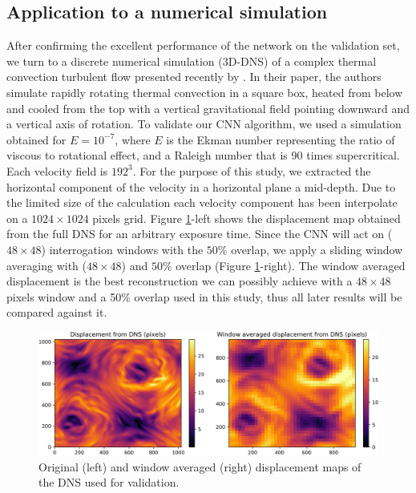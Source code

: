 \documentclass{svjour3}                     %
\begin{document}
\subsection{Application to a numerical simulation}

After confirming the excellent performance of the network on the validation set, we turn to a discrete numerical simulation (3D-DNS) of a complex thermal convection turbulent flow presented recently by \cite{plumley2016effects}. In their paper, the authors simulate rapidly rotating thermal convection in a square box, heated from below and cooled from the top with a vertical gravitational field pointing downward and a vertical axis of rotation. To validate our CNN algorithm, we used a simulation obtained for $E=10^{-7}$, where $E$ is the Ekman number representing the ratio of viscous to rotational effect, and a Raleigh number that is 90 times supercritical. Each velocity field is $192^3$. For the purpose of this study, we extracted the horizontal component of the velocity in a horizontal plane a mid-depth. Due to the limited size of the calculation each velocity component has been interpolate on a $1024\times 1024$ pixels grid. 
Figure \ref{fig:fig6}-left shows the displacement map obtained from the full DNS for an arbitrary exposure time. Since the CNN will act on ($48\times48$) interrogation windows with the $50\%$ overlap, we apply a sliding window averaging with ($48\times48$) and $50\%$ overlap (Figure \ref{fig:fig6}-right). The window averaged displacement is the best reconstruction we can possibly achieve with a $48 \times 48$ pixels window and a 50\% overlap used in this study, thus all later results will be compared against it.

\begin{figure}
\includegraphics[width=\textwidth]{figs/figure5.png}
\caption{Original (left) and window averaged (right) displacement maps of the DNS \cite{plumley2016effects} used for validation.}
\label{fig:fig6}
\end{figure}
\end{document}
